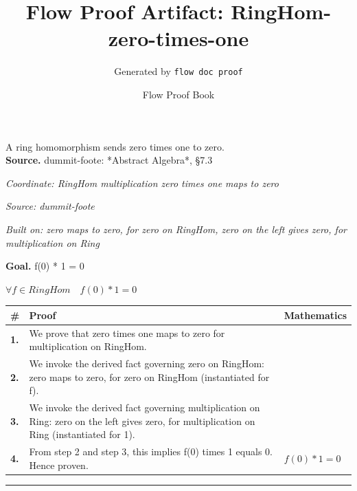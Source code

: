 \documentclass[11pt]{article}
\title{Flow Proof Artifact: RingHom-zero-times-one}
\author{Generated by \texttt{flow doc proof}}
\date{Flow Proof Book}
\theoremstyle{definition}
\begin{document}
\maketitle
A ring homomorphism sends zero times one to zero.\\[0.5em]
\textbf{Source.} dummit-foote: *Abstract Algebra*, §7.3\\[0.5em]
\bigskip
{}\par
\smallskip\noindent\textit{Coordinate: RingHom \cdot multiplication \cdot zero times one maps to zero}\par
\smallskip\noindent\textit{Source: dummit-foote}\par
\smallskip\noindent\textit{Built on: zero maps to zero, for zero on RingHom, zero on the left gives zero, for multiplication on Ring}\par
\medskip
\noindent\textbf{Goal.} f(0) * 1 = 0\par
\noindent$\displaystyle \forall f \in RingHom\quad f(0) * 1 = 0$\par
\medskip
\noindent
\begin{tabular}{@{} >{\raggedright\arraybackslash}p{} >{\raggedright\arraybackslash}p{} >{\raggedleft\arraybackslash}p{} @{}}
\textbf{\#} & \textbf{Proof} & \textbf{Mathematics} \\
\midrule
\textbf{1.} & We prove that zero times one maps to zero for multiplication on RingHom. & \\[0.45em]
\textbf{2.} & We invoke the derived fact governing zero on RingHom: zero maps to zero, for zero on RingHom (instantiated for f). & \\[0.45em]
\textbf{3.} & We invoke the derived fact governing multiplication on Ring: zero on the left gives zero, for multiplication on Ring (instantiated for 1). & \\[0.45em]
\textbf{4.} & From step 2 and step 3, this implies f(0) times 1 equals 0. Hence proven. & $\displaystyle f(0) * 1 = 0$ \\[0.45em]
\bottomrule
\end{tabular}
\label{thm:RingHom-multiplication-zero_times_one_maps_to_zero}
\par\medskip\hrule
\end{document}
